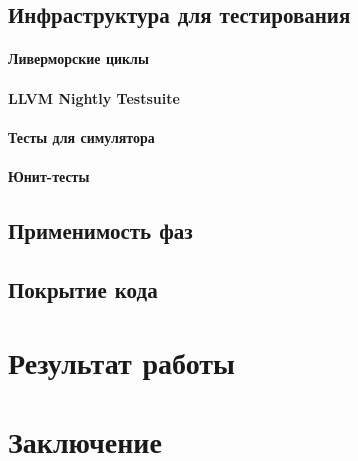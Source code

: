 \documentclass[12pt,a4paper]{article}
\begin{document}
\subsection{Инфраструктура для тестирования}

\paragraph{Ливерморские циклы}

\paragraph{LLVM Nightly Testsuite}

\paragraph{Тесты для симулятора}

\paragraph{Юнит-тесты}

\subsection{Применимость фаз}

\subsection{Покрытие кода}

\section{Результат работы}

\section{Заключение}
\end{document}
